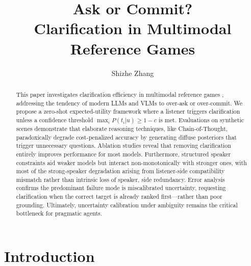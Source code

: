 \documentclass[11pt]{article}
\title{Ask or Commit? \\ Clarification in Multimodal Reference Games\\[4pt]}
\author{Shizhe Zhang}
\affil{\texttt{shizhe\_zhang@berkeley.edu}}
\date{}
\begin{document}
\maketitle
\fancyhead{}
\renewcommand{\headrulewidth}{0pt}


\begin{abstract}
This paper investigates clarification efficiency in multimodal reference games , addressing the tendency of modern LLMs and VLMs to over-ask or over-commit. We propose a zero-shot expected-utility framework where a listener triggers clarification unless a confidence threshold $\max_{i}P(t_{i}|u)\ge1-c$ is met. Evaluations on synthetic scenes demonstrate that elaborate reasoning techniques, like Chain-of-Thought, paradoxically degrade cost-penalized accuracy by generating diffuse posteriors that trigger unnecessary questions. Ablation studies reveal that removing clarification entirely improves performance for most models. Furthermore, structured speaker constraints aid weaker models but interact non-monotonically with stronger ones, with most of the strong-speaker degradation arising from listener-side compatibility mismatch rather than intrinsic loss of speaker, side redundancy. Error analysis confirms the predominant failure mode is miscalibrated uncertainty, requesting clarification when the correct target is already ranked first—rather than poor grounding. Ultimately, uncertainty calibration under ambiguity remains the critical bottleneck for pragmatic agents.
\end{abstract} 


\section{Introduction}
\end{document}
